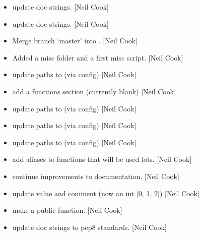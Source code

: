 \documentclass[a4paper,10pt,english]{report}
\begin{document}
\begin{itemize}
\item {} 
 \sphinxhyphen{} update doc strings. {[}Neil Cook{]}

\item {} 
 \sphinxhyphen{} update doc strings. {[}Neil Cook{]}

\item {} 
Merge branch ‘master’ into . {[}Neil Cook{]}

\item {} 
Added a misc folder and a first misc script. {[}Neil Cook{]}

\item {} 
 \sphinxhyphen{} update paths to  (via config) {[}Neil Cook{]}

\item {} 
 \sphinxhyphen{} add a functions section (currently blank) {[}Neil Cook{]}

\item {} 
 \sphinxhyphen{} update paths to  (via config) {[}Neil Cook{]}

\item {} 
 \sphinxhyphen{} update paths to  (via config) {[}Neil Cook{]}

\item {} 
 \sphinxhyphen{} update paths to  (via config) {[}Neil Cook{]}

\item {} 
 \sphinxhyphen{} add aliases to functions that will be used lots.
{[}Neil Cook{]}

\item {} 
 \sphinxhyphen{} continue improvements to documentation. {[}Neil Cook{]}

\item {} 
 \sphinxhyphen{} update  value and comment (now an int
{[}0, 1, 2{]}) {[}Neil Cook{]}

\item {} 
 \sphinxhyphen{} make  a public function. {[}Neil Cook{]}

\item {} 
 \sphinxhyphen{} update doc strings to pep8 standards. {[}Neil Cook{]}


\end{itemize}
\end{document}
